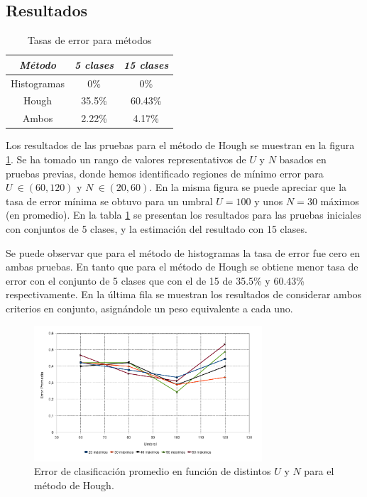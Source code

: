 \documentclass[conference,spanish,a4paper,10pt,oneside,final]{tfmpd}
\begin{document}
\subsection{Resultados}
\begin{table}
\caption{Tasas de error para métodos}
\begin{center}
\begin{tabular}{ccc}
\hline \emph{Método} & \emph{5 clases} & \emph{15 clases}\\ 
\hline Histogramas & 0\% & 0\%\\ 
\hline Hough & 35.5\% & 60.43\%\\ 
\hline Ambos & 2.22\% & 4.17\%\\ 
\hline 
\end{tabular} 
\end{center}
\label{tablaerrores}
\end{table}

Los resultados de las pruebas para el método de Hough se muestran en la figura
\ref{graficaerror}. Se ha tomado un rango de valores representativos de $U$
y $N$ basados en pruebas previas, donde hemos identificado regiones de mínimo
error para $U~\in(60,120)$ y $N~\in(20,60)$.
En la misma figura se puede apreciar que la tasa de error mínima se obtuvo
para un umbral $U = 100$ y unos $N = 30$ máximos (en promedio).
%
En la tabla \ref{tablaerrores} se presentan los resultados para las pruebas
iniciales con conjuntos de 5 clases, y la estimación del resultado con
15 clases. 

Se puede observar que para el método de histogramas la tasa de error fue cero en
ambas pruebas. En tanto que para el método de Hough se obtiene menor tasa de
error con el conjunto de 5 clases que con el de 15 de 35.5\% y 60.43\%
respectivamente.
En la última fila se muestran los resultados de considerar ambos criterios
en conjunto, asignándole un peso equivalente a cada uno. 

\begin{figure}
\begin{center}
\includegraphics[width=8.5cm]{../diagramas/estadistica_noche_iguales} 
\end{center}
\caption{Error de clasificación promedio en función de distintos $U$ y $N$ para
el método de Hough.}
\label{graficaerror}
\end{figure}
%
%
\end{document}
